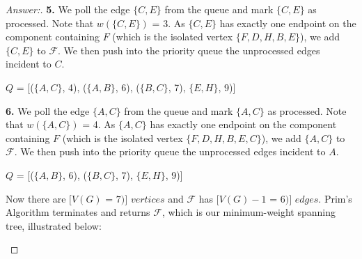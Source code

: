 \documentclass[11pt]{article}
\theoremstyle{definition}
\theoremstyle{definition}
\theoremstyle{definition}
\begin{document}
\begin{proof}[Answer:]
\item \textbf{5.} We poll the edge $\{C, E\}$ from the queue and mark $\{C, E\}$ as processed. Note that $w(\{C, E\})$ = 3. As $\{C, E\}$ has exactly one endpoint on the component containing $F$ (which is the isolated vertex $\{F, D, H, B, E\}$), we add $\{C, E\}$ to $\mathcal{F}$. We then push into the priority queue the unprocessed edges incident to $C$. 
\item $Q$ = [($\{A, C\}$, 4), ($\{A, B\}$, 6), ($\{B, C\}$, 7), $\{E, H\}$, 9)] \\ 

\item \textbf{6.} We poll the edge $\{A, C\}$ from the queue and mark $\{A, C\}$ as processed. Note that $w(\{A, C\})$ = 4. As $\{A, C\}$ has exactly one endpoint on the component containing $F$ (which is the isolated vertex $\{F, D, H, B, E, C\}$), we add $\{A, C\}$ to $\mathcal{F}$. We then push into the priority queue the unprocessed edges incident to $A$.
\item $Q$ = [($\{A, B\}$, 6), ($\{B, C\}$, 7), $\{E, H\}$, 9)] \\

\item Now there are $[V(G)$ = $7)]$ $vertices$ and $\mathcal{F}$ has $[V(G)-1$ = $6)]$ $edges$. Prim’s Algorithm terminates and returns $\mathcal{F}$, which is our minimum-weight spanning tree, illustrated below: \\

\begin{center}
\end{center}


\end{proof}


\end{document}
